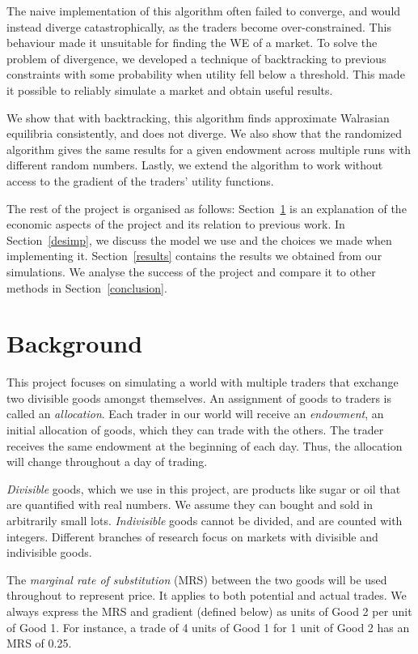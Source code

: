 \documentclass[12pt,a4paper,titlepage]{article}
\begin{document}
The naive implementation of this algorithm often failed to converge, and would instead diverge catastrophically, as the traders become over-constrained.
This behaviour made it unsuitable for finding the WE of a market.
To solve the problem of divergence, we developed a technique of backtracking to previous constraints with some probability when utility fell below a threshold.
This made it possible to reliably simulate a market and obtain useful results.

We show that with backtracking, this algorithm finds approximate Walrasian equilibria consistently, and does not diverge.
We also show that the randomized algorithm gives the same results for a given endowment across multiple runs with different random numbers.
Lastly, we extend the algorithm to work without access to the gradient of the traders' utility functions.

The rest of the project is organised as follows:
Section~\ref{background} is an explanation of the economic aspects of the project and its relation to previous work.
In Section~\ref{desimp}, we discuss the model we use and the choices we made when implementing it.
Section~\ref{results} contains the results we obtained from our simulations.
We analyse the success of the project and compare it to other methods in Section~\ref{conclusion}. 

\clearpage

\section{Background}\label{background}

This project focuses on simulating a world with multiple traders that exchange two divisible goods amongst themselves.
An assignment of goods to traders is called an \textit{allocation}.
Each trader in our world will receive an \textit{endowment}, an initial allocation of goods, which they can trade with the others.
The trader receives the same endowment at the beginning of each day.
Thus, the allocation will change throughout a day of trading.

\textit{Divisible} goods, which we use in this project, are products like sugar or oil that are quantified with real numbers.
We assume they can bought and sold in arbitrarily small lots.
\textit{Indivisible} goods cannot be divided, and are counted with integers.
Different branches of research focus on markets with divisible and indivisible goods.

The \textit{marginal rate of substitution} (MRS) between the two goods will be used throughout to represent price.
It applies to both potential and actual trades.
We always express the MRS and gradient (defined below) as units of Good 2 per unit of Good 1.
For instance, a trade of 4 units of Good 1 for 1 unit of Good 2 has an MRS of 0.25.
\end{document}
